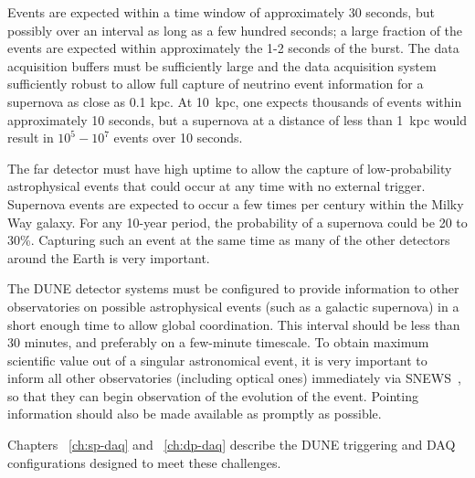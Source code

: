 
Events are expected within a time window of approximately 30 seconds,
but possibly over an interval as long as a few hundred seconds; a
large fraction of the events are expected within approximately the 1-2
seconds of the burst.  The data acquisition buffers must be
sufficiently large and the data acquisition system sufficiently robust
to allow full capture of neutrino event information for a supernova as
close as 0.1 kpc.  At 10~kpc, one expects thousands of events within
approximately 10 seconds, but a supernova at a distance of less than
1~kpc would result in $10^5-10^7$ events over 10 seconds.

The far detector must have high uptime to allow the capture of
low-probability astrophysical events that could occur at any time with
no external trigger.  Supernova events are expected to occur a few
times per century within the Milky Way galaxy. For any 10-year period,
the probability of a supernova could be 20 to 30\%.  Capturing such an
event at the same time as many of the other detectors around the Earth
is very important.

The DUNE detector systems must be configured to provide information
to other observatories on possible astrophysical events (such as a
galactic supernova) in a short enough time to allow global
coordination.  This interval should be less than 30 minutes, and
preferably
on a few-minute timescale.  To obtain maximum scientific value out of a singular
astronomical event, it is very important to inform all other
observatories (including optical ones) immediately via SNEWS~\cite{Antonioli:2004zb,Scholberg:2008fa}, so that they can
begin observation of the evolution of the event. Pointing information
should also be made available as promptly as possible.

Chapters ~\ref{ch:sp-daq} and ~\ref{ch:dp-daq} describe the DUNE triggering and
DAQ configurations designed to meet these challenges.



